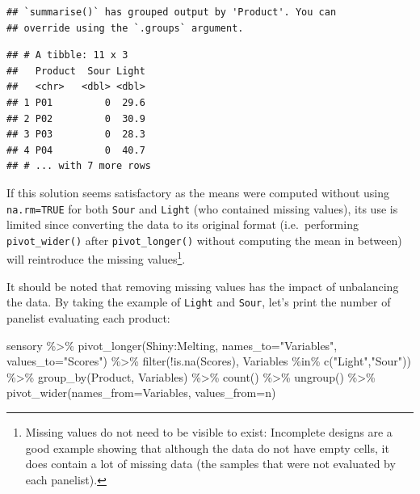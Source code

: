\documentclass[
]{krantz}
\makeatletter
\newenvironment{Shaded}{\begin{snugshade}}{\end{snugshade}}
\newcommand{\AttributeTok}[1]{\textcolor[rgb]{0.61,0.61,0.61}{#1}}
\newcommand{\FunctionTok}[1]{\textcolor[rgb]{0,0,0}{#1}}
\newcommand{\NormalTok}[1]{#1}
\newcommand{\SpecialCharTok}[1]{\textcolor[rgb]{0,0,0}{#1}}
\newcommand{\StringTok}[1]{\textcolor[rgb]{0.5,0.5,0.5}{#1}}
\newenvironment{kframe}{%
\medskip{}
\setlength{\fboxsep}{.8em}
 \def\at@end@of@kframe{}%
 \ifinner\ifhmode%
  \def\at@end@of@kframe{\end{minipage}}%
  \begin{minipage}{\columnwidth}%
 \fi\fi%
 \def\FrameCommand##1{\hskip\@totalleftmargin \hskip-\fboxsep
 \colorbox{shadecolor}{##1}\hskip-\fboxsep
     \hskip-\linewidth \hskip-\@totalleftmargin \hskip\columnwidth}%
 \MakeFramed {\advance\hsize-\width
   \@totalleftmargin\z@ \linewidth\hsize
   \@setminipage}}%
 {\par\unskip\endMakeFramed%
 \at@end@of@kframe}
\renewenvironment{Shaded}{\begin{kframe}}{\end{kframe}}
\makeatother
\begin{document}
\begin{verbatim}
## `summarise()` has grouped output by 'Product'. You can
## override using the `.groups` argument.
\end{verbatim}

\begin{verbatim}
## # A tibble: 11 x 3
##   Product  Sour Light
##   <chr>   <dbl> <dbl>
## 1 P01         0  29.6
## 2 P02         0  30.9
## 3 P03         0  28.3
## 4 P04         0  40.7
## # ... with 7 more rows
\end{verbatim}

If this solution seems satisfactory as the means were computed without using \texttt{na.rm=TRUE} for both \texttt{Sour} and \texttt{Light} (who contained missing values), its use is limited since converting the data to its original format (i.e.~performing \texttt{pivot\_wider()} after \texttt{pivot\_longer()} without computing the mean in between) will reintroduce the missing values\footnote{Missing values do not need to be visible to exist: Incomplete designs are a good example showing that although the data do not have empty cells, it does contain a lot of missing data (the samples that were not evaluated by each panelist).}.

It should be noted that removing missing values has the impact of unbalancing the data. By taking the example of \texttt{Light} and \texttt{Sour}, let's print the number of panelist evaluating each product:

\begin{Shaded}
\begin{Highlighting}[]
\NormalTok{sensory }\SpecialCharTok{\%\textgreater{}\%} 
  \FunctionTok{pivot\_longer}\NormalTok{(Shiny}\SpecialCharTok{:}\NormalTok{Melting, }\AttributeTok{names\_to=}\StringTok{"Variables"}\NormalTok{, }\AttributeTok{values\_to=}\StringTok{"Scores"}\NormalTok{) }\SpecialCharTok{\%\textgreater{}\%} 
  \FunctionTok{filter}\NormalTok{(}\SpecialCharTok{!}\FunctionTok{is.na}\NormalTok{(Scores),}
\NormalTok{         Variables }\SpecialCharTok{\%in\%} \FunctionTok{c}\NormalTok{(}\StringTok{"Light"}\NormalTok{,}\StringTok{"Sour"}\NormalTok{)) }\SpecialCharTok{\%\textgreater{}\%}
  \FunctionTok{group\_by}\NormalTok{(Product, Variables) }\SpecialCharTok{\%\textgreater{}\%} 
  \FunctionTok{count}\NormalTok{() }\SpecialCharTok{\%\textgreater{}\%} 
  \FunctionTok{ungroup}\NormalTok{() }\SpecialCharTok{\%\textgreater{}\%} 
  \FunctionTok{pivot\_wider}\NormalTok{(}\AttributeTok{names\_from=}\NormalTok{Variables, }\AttributeTok{values\_from=}\NormalTok{n)}
\end{Highlighting}
\end{Shaded}
\end{document}
